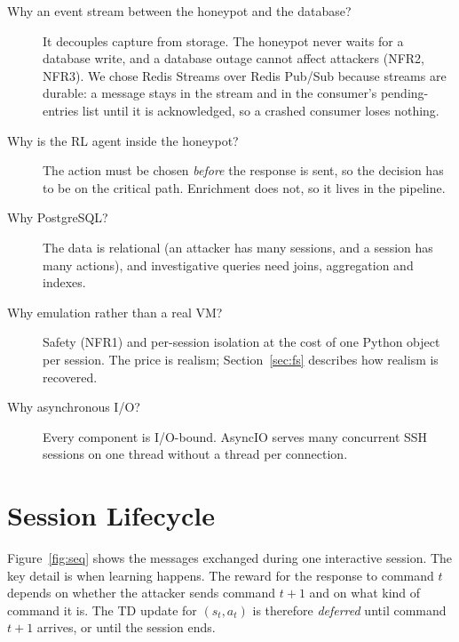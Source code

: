 \begin{description}
  \item[Why an event stream between the honeypot and the database?] It decouples capture
    from storage. The honeypot never waits for a database write, and a database outage cannot
    affect attackers (NFR2, NFR3). We chose Redis Streams over Redis Pub/Sub because streams
    are durable: a message stays in the stream and in the consumer's pending-entries list until
    it is acknowledged, so a crashed consumer loses nothing.
  \item[Why is the RL agent inside the honeypot?] The action must be chosen \emph{before} the
    response is sent, so the decision has to be on the critical path. Enrichment does not, so
    it lives in the pipeline.
  \item[Why PostgreSQL?] The data is relational (an attacker has many sessions, and a session
    has many actions), and investigative queries need joins, aggregation and indexes.
  \item[Why emulation rather than a real VM?] Safety (NFR1) and per-session isolation at the
    cost of one Python object per session. The price is realism; Section~\ref{sec:fs} describes
    how realism is recovered.
  \item[Why asynchronous I/O?] Every component is I/O-bound. AsyncIO serves many concurrent
    SSH sessions on one thread without a thread per connection.
\end{description}

\section{Session Lifecycle}

Figure~\ref{fig:seq} shows the messages exchanged during one interactive session. The key
detail is when learning happens. The reward for the response to command $t$ depends on whether
the attacker sends command $t+1$ and on what kind of command it is. The TD update for
$(s_t, a_t)$ is therefore \emph{deferred} until command $t+1$ arrives, or until the session ends.

